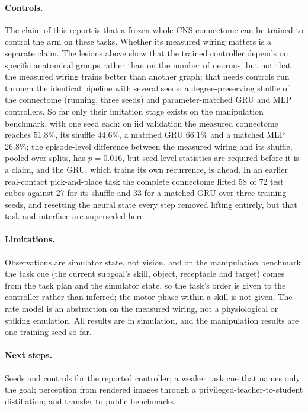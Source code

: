 \documentclass[10pt,twocolumn]{article}
\begin{document}
\paragraph{Controls.}
The claim of this report is that a frozen whole-CNS connectome can be trained to control the arm on these tasks.
Whether its measured wiring matters is a separate claim.
The lesions above show that the trained controller depends on specific anatomical groups rather than on the number of neurons, but not that the measured wiring trains better than another graph; that needs controls run through the identical pipeline with several seeds: a degree-preserving shuffle of the connectome (running, three seeds) and parameter-matched GRU and MLP controllers.
So far only their imitation stage exists on the manipulation benchmark, with one seed each: on iid validation the measured connectome reaches 51.8\%, its shuffle 44.6\%, a matched GRU 66.1\% and a matched MLP 26.8\%; the episode-level difference between the measured wiring and its shuffle, pooled over splits, has $p = 0.016$, but seed-level statistics are required before it is a claim, and the GRU, which trains its own recurrence, is ahead.
In an earlier real-contact pick-and-place task the complete connectome lifted 58 of 72 test cubes against 27 for its shuffle and 33 for a matched GRU over three training seeds, and resetting the neural state every step removed lifting entirely, but that task and interface are superseded here.

\paragraph{Limitations.}
Observations are simulator state, not vision, and on the manipulation benchmark the task cue (the current subgoal's skill, object, receptacle and target) comes from the task plan and the simulator state, so the task's order is given to the controller rather than inferred; the motor phase within a skill is not given.
The rate model is an abstraction on the measured wiring, not a physiological or spiking emulation.
All results are in simulation, and the manipulation results are one training seed so far.

\paragraph{Next steps.}
Seeds and controls for the reported controller; a weaker task cue that names only the goal; perception from rendered images through a privileged-teacher-to-student distillation; and transfer to public benchmarks.
\end{document}
